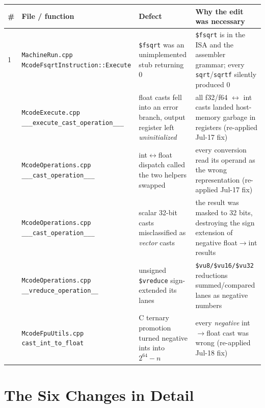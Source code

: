 \documentclass[11pt,a4paper]{report}
\begin{document}
\begin{longtable}{@{}p{0.5cm}p{3.6cm}p{4.3cm}p{5.6cm}@{}}
\toprule
\# & File / function & Defect & Why the edit was necessary \\
\midrule
1 & \texttt{MachineRun.cpp} \newline \texttt{McodeFsqrtInstruction::Execute} &
    \texttt{\$fsqrt} was an unimplemented stub returning 0 &
    \texttt{\$fsqrt} is in the ISA and the assembler grammar; every
    \texttt{sqrt}/\texttt{sqrtf} silently produced 0 \\
\addlinespace
2 & \texttt{McodeExecute.cpp} \newline \texttt{\_\_\_execute\_cast\_operation\_\_\_} &
    float casts fell into an error branch, output register left
    \emph{uninitialized} &
    all f32/f64 $\leftrightarrow$ int casts landed host-memory garbage in
    registers (re-applied Jul-17 fix) \\
\addlinespace
3 & \texttt{McodeOperations.cpp} \newline \texttt{\_\_\_cast\_operation\_\_\_} &
    int$\leftrightarrow$float dispatch called the two helpers swapped &
    every conversion read its operand as the wrong representation
    (re-applied Jul-17 fix) \\
\addlinespace
4 & \texttt{McodeOperations.cpp} \newline \texttt{\_\_\_cast\_operation\_\_\_} &
    scalar 32-bit casts misclassified as \emph{vector} casts &
    the result was masked to 32 bits, destroying the sign extension of
    negative float$\to$int results \\
\addlinespace
5 & \texttt{McodeOperations.cpp} \newline \texttt{\_\_vreduce\_operation\_\_} &
    unsigned \texttt{\$vreduce} sign-extended its lanes &
    \texttt{\$vu8/\$vu16/\$vu32} reductions summed/compared lanes as negative
    numbers \\
\addlinespace
6 & \texttt{McodeFpuUtils.cpp} \newline \texttt{cast\_int\_to\_float} &
    C ternary promotion turned negative ints into $2^{64}-n$ &
    every \emph{negative} int$\to$float cast was wrong
    (re-applied Jul-18 fix) \\
\bottomrule
\end{longtable}

\chapter{The Six Changes in Detail}
\end{document}
